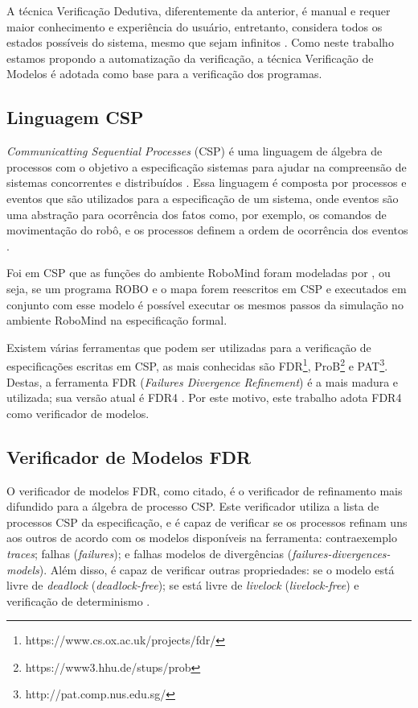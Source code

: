 A técnica Verificação Dedutiva, diferentemente da anterior, é manual e requer maior conhecimento e experiência do usuário, entretanto, considera todos os estados possíveis do sistema, mesmo que sejam infinitos \cite{FEIGN}. Como neste trabalho estamos propondo a automatização da verificação, a técnica Verificação de Modelos é adotada como base para a verificação dos programas.

\subsection{Linguagem CSP}
\textit{Communicatting Sequential Processes} (CSP) é uma linguagem de álgebra de processos com o objetivo a especificação sistemas para ajudar na compreensão de sistemas concorrentes e distribuídos \cite{Cleaveland2018}. Essa linguagem é composta por processos e eventos que são utilizados para a especificação de um sistema, onde eventos são uma abstração para ocorrência dos fatos como, por exemplo, os comandos de movimentação do robô, e os processos definem a ordem de ocorrência dos eventos \cite{Roscoe2010}.

Foi em CSP que as funções do ambiente RoboMind foram modeladas por \cite{nogueira}, ou seja, se um programa ROBO e o mapa forem reescritos em CSP e executados em conjunto com esse modelo é possível executar os mesmos passos da simulação no ambiente RoboMind na especificação formal.

Existem várias ferramentas que podem ser utilizadas para a verificação de especificações escritas em CSP, as mais conhecidas são FDR\footnote[3]{https://www.cs.ox.ac.uk/projects/fdr/}, ProB\footnote[4]{https://www3.hhu.de/stups/prob} e PAT\footnote[5]{http://pat.comp.nus.edu.sg/}. Destas, a ferramenta FDR (\textit{Failures Divergence Refinement}) é a mais madura e utilizada; sua versão atual é FDR4 \cite{Gibson}. Por este motivo, este trabalho adota FDR4 como verificador de modelos.

\subsection{Verificador de Modelos FDR}

O verificador de modelos FDR, como citado, é o verificador de refinamento mais difundido para a álgebra de processo CSP. Este verificador utiliza a lista de processos CSP da especificação, e é capaz de verificar se os processos refinam uns aos outros de acordo com os modelos disponíveis na ferramenta: contraexemplo \textit{traces}; falhas (\textit{failures}); e falhas modelos de divergências (\textit{failures-divergences-models}). Além disso, é capaz de verificar outras propriedades: se o modelo está livre de \textit{deadlock} (\textit{deadlock-free}); se está livre de \textit{livelock} (\textit{livelock-free}) e verificação de determinismo \cite{Gibson}.

